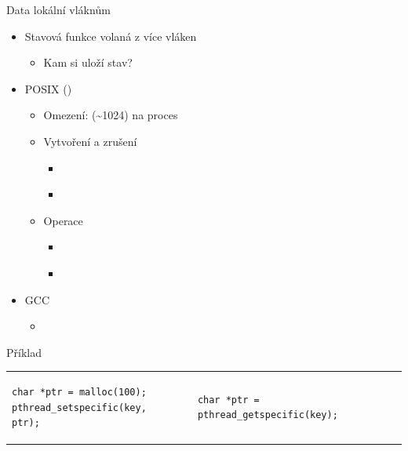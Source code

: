 \begin{frame}[fragile]{Data lokální vláknům}

  \begin{itemize}
    \item Stavová funkce volaná z více vláken
    \begin{itemize}
      \item Kam si uloží stav?
    \end{itemize}

    \pause

    \item POSIX ()
    \begin{itemize}
      \item Omezení:  (\textasciitilde 1024) na proces

      \pause

      \item Vytvoření a zrušení
      \begin{itemize}
	\item {} \\
	\item {}
      \end{itemize}

      \pause

      \item Operace
      \begin{itemize}
	\item {}
	\item {} \\
      \end{itemize}
    \end{itemize}

    \pause

    \item GCC
    \begin{itemize}
      \item {}
    \end{itemize}
  \end{itemize}


  \begin{block}{Příklad}
  \begin{tabular}{lp{3em}l}
  \begin{lstlisting}
char *ptr = malloc(100);
pthread_setspecific(key, ptr);
  \end{lstlisting} & &
  \begin{lstlisting}[showlines]
char *ptr = pthread_getspecific(key);

  \end{lstlisting}
  \end{tabular}
  \end{block}

\end{frame}

